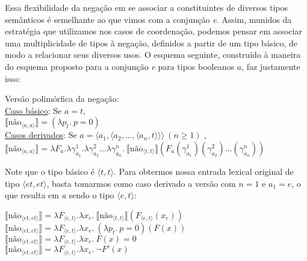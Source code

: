 Essa flexibilidade da negação em se associar a constituintes de diversos tipos semânticos é semelhante ao que vimos com a conjunção \textit{e}. Assim, munidos da estratégia que utilizamos nos casos de
coordena\-ção, podemos pensar em associar uma multiplicidade de tipos à
nega\-ção, definidos a partir de um tipo básico, de modo a relacionar
seus diversos usos. O esquema seguinte, construído à maneira do
esquema proposto para a conjun\-ção \textit{e} para tipos booleanos $a$, faz justamente isso:

\begin{exe}
	\ex Versão polimórfica da negação: \\
	\hspace*{18pt}\underline{Caso básico}: Se $a = t$, \\
	\hspace*{30pt} $\llbracket \text{não}_{\langle a,a\rangle}\rrbracket = (\lambda p_{t}.\ p=0)$\\ 
	\hspace*{18pt}\underline{Casos derivados}: Se $a = \langle a_{1},\langle a_{2}, ... ,\langle a_{n},t\rangle\rangle\rangle\ (n\geq 1)$ , \\
	\hspace*{30pt} $\llbracket \text{não}_{\langle a,a\rangle} \rrbracket = \lambda F_{a}.\lambda \gamma_{a_{1}}^{1}.\lambda \gamma_{a_{2}}^{2}...\lambda \gamma_{a_{n}}^{n}.\ \llbracket  \text{não}_{\langle t,t\rangle}\rrbracket(F_{a}(\gamma_{a_{1}}^{1})(\gamma_{a_{2}}^{2})...(\gamma_{a_{n}}^{n}))$
\end{exe}

\n Note que o tipo básico é $\langle t,t\rangle$. Para obtermos nossa entrada lexical original de tipo $\langle et, et\rangle$, basta tomarmos como caso derivado a versão com $n=1$ e $a_{1}=e$, o que resulta em \textit{a} sendo o tipo $\langle e,t\rangle$:

\begin{exe}
	\ex $\llbracket \text{não}_{\langle et,et\rangle} \rrbracket = \lambda F_{\langle e,t\rangle}.\lambda x_{e}.\ \llbracket  \text{não}_{\langle t,t\rangle}\rrbracket(F_{\langle e,t\rangle}(x_{e}))$\\
	$\llbracket \text{não}_{\langle et,et\rangle} \rrbracket = \lambda F_{\langle e,t\rangle}.\lambda x_{e}.\ (\lambda p_{t}.\ p=0)(F(x))$\\
	$\llbracket \text{não}_{\langle et,et\rangle} \rrbracket = \lambda F_{\langle e,t\rangle}.\lambda x_{e}.\ F(x)=0$\\
	$\llbracket \text{não}_{\langle et,et\rangle} \rrbracket = \lambda F_{\langle e,t\rangle}.\lambda x_{e}.\ \neg F'(x)$
\end{exe}

